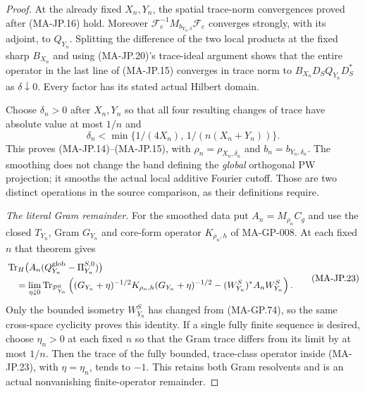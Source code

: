 \begin{proof}
At the already fixed $X_n,Y_n$, the spatial trace-norm
convergences proved after (MA-JP.16) hold.
Moreover
$\mathcal F_e^{-1}M_{b_{Y_n,\delta}}\mathcal F_e$
converges strongly, with its adjoint, to $Q_{Y_n}$.
Splitting the difference of the two local products
at the fixed sharp $B_{X_n}$ and using (MA-JP.20)'s
trace-ideal argument shows that the entire operator
in the last line of (MA-JP.15) converges in trace norm to
$B_{X_n}D_SQ_{Y_n}D_S^*$ as $\delta\downarrow0$.
Every factor has its stated actual Hilbert domain.

Choose $\delta_n>0$ after $X_n,Y_n$ so that all
four resulting changes of trace have absolute
value at most $1/n$ and
\[
             \delta_n<
        \min\{1/(4X_n),\,1/(n(X_n+Y_n))\}.
 \tag{MA-JP.22}
\]
This proves (MA-JP.14)--(MA-JP.15), with
$\rho_n=\rho_{X_n,\delta_n}$ and
$b_n=b_{Y_n,\delta_n}$.
The smoothing does not change the band defining
the \emph{global} orthogonal PW projection; it
smooths the actual local additive Fourier cutoff.
Those are two distinct operations in the source
comparison, as their definitions require.

\emph{The literal Gram remainder.}
For the smoothed data put
$A_n=M_{\rho_n}C_g$ and use the closed
$T_{Y_n}$, Gram $G_{Y_n}$ and core-form operator
$K_{\rho_n,h}$ of MA-GP-008.
At each fixed $n$ that theorem gives
\[
 \begin{split}
 &\operatorname{Tr}_H
      \bigl(A_n(Q_{Y_n}^{\rm glob}-\Pi_{Y_n}^{S,0})\bigr)\\
 &\quad=\lim_{\eta\downarrow0}
    \operatorname{Tr}_{\mathcal P_{Y_n}^0}
     \left((G_{Y_n}+\eta)^{-1/2}
             K_{\rho_n,h}(G_{Y_n}+\eta)^{-1/2}
                    -(W_{Y_n}^S)^*A_nW_{Y_n}^S\right).
 \end{split}
 \tag{MA-JP.23}
\]
Only the bounded isometry $W_{Y_n}^S$ has changed
from (MA-GP.74), so the same cross-space cyclicity
proves this identity.  If a single fully finite
sequence is desired, choose $\eta_n>0$ at each
fixed $n$ so that the Gram trace differs from
its limit by at most $1/n$.
Then the trace of the fully bounded, trace-class
operator inside (MA-JP.23), with $\eta=\eta_n$,
tends to $-1$.  This retains both Gram resolvents
and is an actual nonvanishing finite-operator
remainder.
\end{proof}

